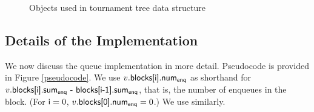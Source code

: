 \begin{figure}
\begin{algorithmic}[1]



\end{algorithmic}
\caption{Objects used in tournament tree data structure \label{object-fields}}
\end{figure}

\subsection{Details of the Implementation}

We now discuss the queue implementation in more detail.  Pseudocode is provided in Figure \ref{pseudocode}.
We use $v.\mbox{\sf blocks[i].num\textsubscript{enq}}$ as shorthand for 
$v.\mbox{\sf blocks[i].sum\textsubscript{enq} - blocks[i-1].sum\textsubscript{enq}}$, that is, 
the number of enqueues in the block.  (For $\mbox{\sf i}=0$, $v.\mbox{\sf blocks[0].num\textsubscript{enq}} = 0$.)
We use  similarly.

